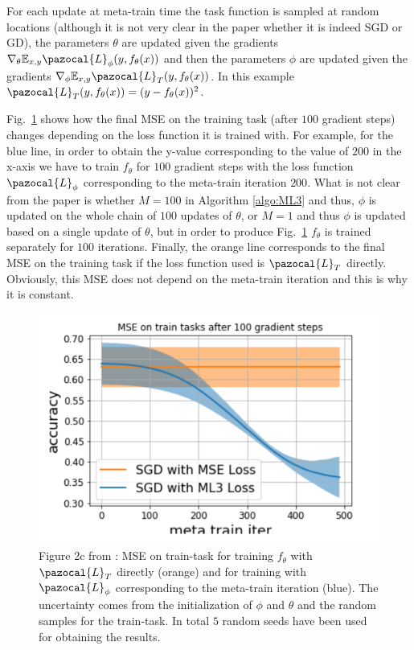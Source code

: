For each update at meta-train time the task function is sampled at random locations (although it is not very clear in the paper whether it is indeed SGD or GD), the parameters $\theta$ are updated given the gradients $\nabla_{\theta}\mathbb{E}_{x,y}\pazocal{L}_{\phi}(y, f_{\theta}(x))$ and then the parameters $\phi$ are updated given the gradients $\nabla_{\phi}\mathbb{E}_{x,y}\pazocal{L}_{T}(y, f_{\theta}(x))$.
In this example $\pazocal{L}_{T}(y, f_{\theta}(x)) = (y - f_{\theta}(x))^2$.

Fig.~\ref{fig:fig2c} shows how the final MSE on the training task (after $100$ gradient steps) changes depending on the loss function it is trained with. 
For example, for the blue line, in order to obtain the y-value corresponding to the value of $200$ in the x-axis we have to train $f_{\theta}$ for $100$ gradient steps with the loss function $\pazocal{L}_{\phi}$ corresponding to the meta-train iteration $200$. 
What is not clear from the paper is whether $M=100$ in Algorithm \ref{algo:ML3} and thus, $\phi$ is updated on the whole chain of $100$ updates of $\theta$, or $M=1$ and thus $\phi$ is updated based on a single update of $\theta$, but in order to produce Fig.~\ref{fig:fig2c} $f_{\theta}$ is trained separately for $100$ iterations.
Finally, the orange line corresponds to the final MSE on the training task if the loss function used is $\pazocal{L}_{T}$ directly. 
Obviously, this MSE does not depend on the meta-train iteration and this is why it is constant.

\begin{figure}[H]
	\centering
	\includegraphics[width=0.65\linewidth]{./Figures/fig2c.png}
	\caption{Figure 2c from \textcite{bechtle2020metalearning}: MSE on train-task for training $f_{\theta}$ with $\pazocal{L}_{T}$ directly (orange) and for training with $\pazocal{L}_{\phi}$ corresponding to the meta-train iteration (blue).
	The uncertainty comes from the initialization of $\phi$ and $\theta$ and the random samples for the train-task. 
	In total $5$ random seeds have been used for obtaining the results.}
	\label{fig:fig2c}
\end{figure}

